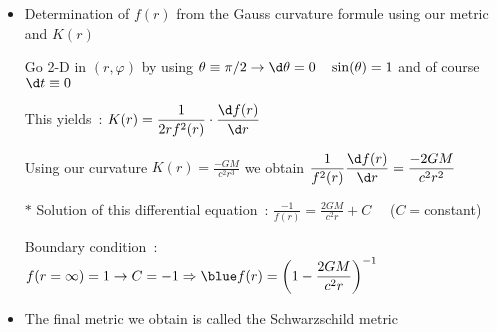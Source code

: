 \Tr
\begin{itemize}
\item Determination of $f(r)$ from the Gauss curvature formule using our metric and $K(r)$
\item[] Go 2-D in $(r,\varphi)$ by using $\theta \equiv \pi/2 \rightarrow \d\theta=0 \quad \sin(\theta)=1$
        and of course $\d t \equiv 0$
\item[] This yields~: $\displaystyle K(r)=\frac{1}{2rf^{2}(r)}\cdot\frac{\d f(r)}{\d r}$
\item[] Using our curvature $\displaystyle K(r)=\frac{-GM}{c^{2}r^{3}}$ we obtain
        $\displaystyle \frac{1}{f^{2}(r)}\frac{\d f(r)}{\d r}=\frac{-2GM}{c^{2}r^{2}}$
\item[$\ast$] Solution of this differential equation~:
              $\displaystyle \frac{-1}{f(r)}=\frac{2GM}{c^{2}r}+C \quad$ ($C=$constant)
\item[] Boundary condition~: $f(r=\infty)=1 \rightarrow C=-1
        \Rightarrow {\displaystyle \blue f(r)=\left(1-\frac{2GM}{c^{2}r}\right)^{-1}}$
\item The final metric we obtain is called the {\blue Schwarzschild metric}\\
\item[]{\red {}}
\end{itemize}

